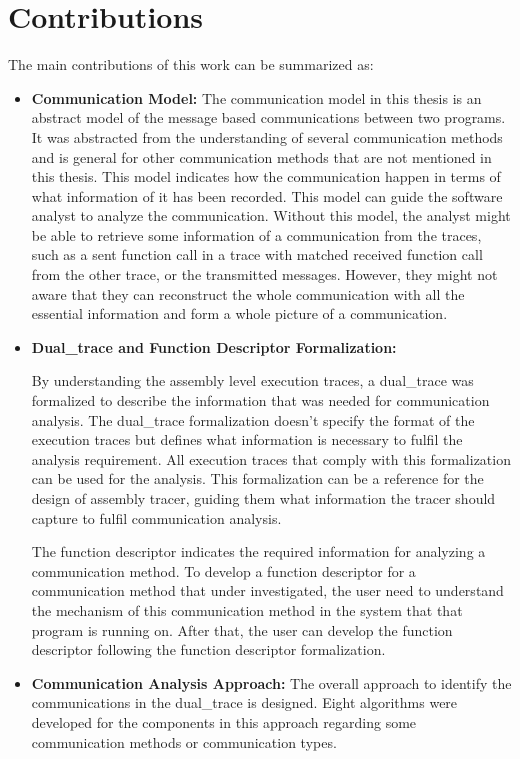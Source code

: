 \section{Contributions}
The main contributions of this work can be summarized as:
\begin{itemize}
  \item \textbf{Communication Model:} The communication model in this thesis is an abstract model of the message based communications between two programs. It was abstracted from the understanding of several communication methods and is general for other communication methods that are not mentioned in this thesis. This model indicates how the communication happen in terms of what information of it has been recorded. This model can guide the software analyst to analyze the communication. Without this model, the analyst might be able to retrieve some information of a communication from the traces, such as a sent function call in a trace with matched received function call from the other trace, or the transmitted messages. However, they might not aware that they can reconstruct the whole communication with all the essential information and form a whole picture of a communication.
  \item \textbf{Dual\_trace and Function Descriptor Formalization:} 
  
By understanding the assembly level execution traces, a dual\_trace was formalized to describe the information that was needed for communication analysis. The dual\_trace formalization doesn't specify the format of the execution traces but defines what information is necessary to fulfil the analysis requirement. All execution traces that comply with this formalization can be used for the analysis. This formalization can be a reference for the design of assembly tracer, guiding them what information the tracer should capture to fulfil communication analysis.

The function descriptor indicates the required information for analyzing a communication method. To develop a function descriptor for a communication method that under investigated, the user need to understand the mechanism of this communication method in the system that that program is running on. After that, the user can develop the function descriptor following the function descriptor formalization.

  \item \textbf{Communication Analysis Approach:} The overall approach to identify the communications in the dual\_trace is designed. Eight algorithms were developed for the components in this approach regarding some communication methods or communication types. 
  

\end{itemize}
